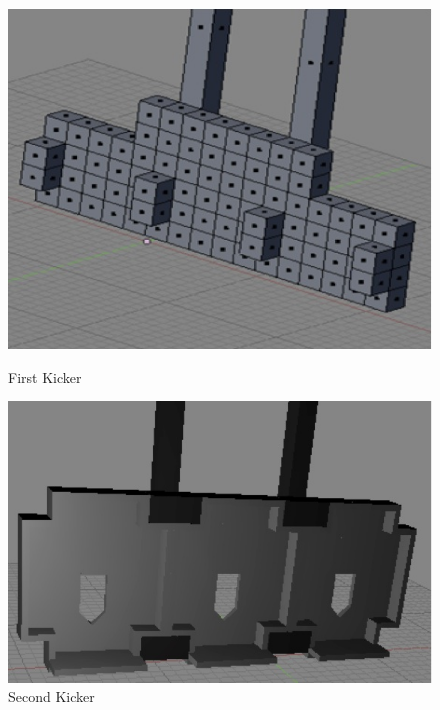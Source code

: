 \documentclass[12pt, a4paper, titlepage]{article}
\begin{document}
\begin{figure}[ht]
\begin{centering}
\begin{minipage}[b]{0.3\linewidth}
\centering
\includegraphics[scale=0.5]{images/robot/firstkicker.jpg}
\caption{First Kicker}
\label{fig:firstkicker}
\end{minipage}
\hspace{0.3cm}
\begin{minipage}[b]{0.3\linewidth}
\centering
\includegraphics[scale=0.5]{images/robot/secondkicker.jpg}
\caption{Second Kicker}
\label{fig:secondkicker}
\end{minipage}
\hspace{0.3cm}
\begin{minipage}[b]{0.3\linewidth}
\centering

\end{minipage}
\end{centering}
\end{figure}
\end{document}
